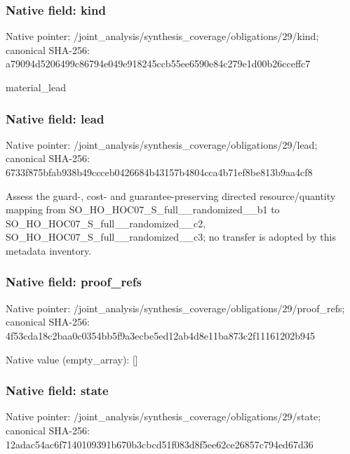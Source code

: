 \documentclass[10pt,a4paper]{article}
\begin{document}
\subsubsection{Native field: kind}
Native pointer: /joint\_\allowbreak{}analysis/synthesis\_\allowbreak{}coverage/obligations/29/kind; canonical SHA-256: a79094d5206499c86794e049e918245ccb55ee6590e84c279e1d00b26cceffc7

\begingroup\raggedright\sloppy material\_\allowbreak{}lead\par\endgroup

\subsubsection{Native field: lead}
Native pointer: /joint\_\allowbreak{}analysis/synthesis\_\allowbreak{}coverage/obligations/29/lead; canonical SHA-256: 6733f875bfab938b49ccceb0426684b43157b4804cca4b71ef8be813b9aa4cf8

\begingroup\raggedright\sloppy Assess the guard-,\allowbreak{} cost- and guarantee-preserving directed resource/\allowbreak{}quantity mapping from SO\_\allowbreak{}HO\_\allowbreak{}HOC07\_\allowbreak{}S\_\allowbreak{}full\_\allowbreak{}\_\allowbreak{}randomized\_\allowbreak{}\_\allowbreak{}b1 to SO\_\allowbreak{}HO\_\allowbreak{}HOC07\_\allowbreak{}S\_\allowbreak{}full\_\allowbreak{}\_\allowbreak{}randomized\_\allowbreak{}\_\allowbreak{}c2,\allowbreak{} SO\_\allowbreak{}HO\_\allowbreak{}HOC07\_\allowbreak{}S\_\allowbreak{}full\_\allowbreak{}\_\allowbreak{}randomized\_\allowbreak{}\_\allowbreak{}c3;\allowbreak{} no transfer is adopted by this metadata inventory.\par\endgroup

\subsubsection{Native field: proof\_\allowbreak{}refs}
Native pointer: /joint\_\allowbreak{}analysis/synthesis\_\allowbreak{}coverage/obligations/29/proof\_\allowbreak{}refs; canonical SHA-256: 4f53cda18c2baa0c0354bb5f9a3ecbe5ed12ab4d8e11ba873c2f11161202b945

Native value (empty\_\allowbreak{}array): []

\subsubsection{Native field: state}
Native pointer: /joint\_\allowbreak{}analysis/synthesis\_\allowbreak{}coverage/obligations/29/state; canonical SHA-256: 12adac54ac6f7140109391b670b3cbcd51f083d8f5ee62ce26857c794ed67d36
\end{document}
